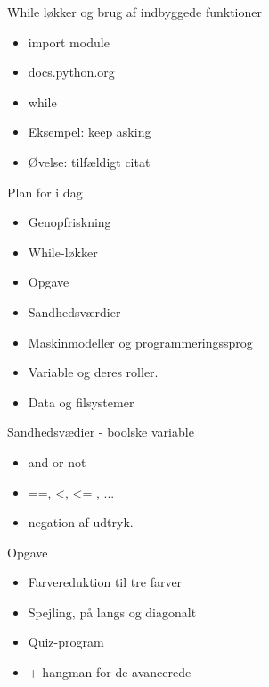 \documentclass[a4paper,landscape]{slides}
\begin{document}
\begin{slide}
	\begin{center} {\large 
            While løkker og brug af indbyggede funktioner
	} \end{center}
	\begin{itemize} \addtolength{\itemsep}{-\baselineskip}
                \item import module
                \item docs.python.org
                \item while
    		\item Eksempel: keep asking
    		\item Øvelse: tilfældigt citat
	\end{itemize}
\end{slide}

\begin{slide}
	\begin{center} {\large 
            Plan for i dag
	} \end{center}
	\begin{itemize} \addtolength{\itemsep}{-\baselineskip}
    		\item Genopfriskning
    		\item While-løkker
    		\item Opgave
    		\item Sandhedsværdier
    		\item Maskinmodeller og programmeringssprog
    		\item Variable og deres roller.
    		\item Data og filsystemer
	\end{itemize}
\end{slide}


\begin{slide}
	\begin{center} {\large 
            Sandhedsvædier - boolske variable
	} \end{center}
	\begin{itemize} \addtolength{\itemsep}{-\baselineskip}
    		\item and or not
                \item ==, <, <= , ...
                \item negation af udtryk.
	\end{itemize}
\end{slide}

\begin{slide}
	\begin{center} {\large 
            Opgave
	} \end{center}
	\begin{itemize} \addtolength{\itemsep}{-\baselineskip}
    		\item Farvereduktion til tre farver
                \item Spejling, på langs og diagonalt
                \item Quiz-program
                \item + hangman for de avancerede
	\end{itemize}
\end{slide}
\end{document}
